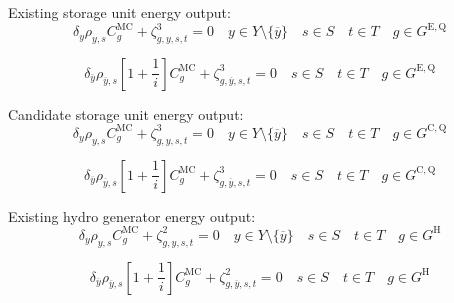 \documentclass{article}
\newcommand{\sGeneratorsHydro}{G^{\mathrm{H}}}
\newcommand{\sStorageExisting}{G^{\mathrm{E,Q}}}
\newcommand{\sStorageCandidate}{G^{\mathrm{C,Q}}}
\newcommand{\sYears}{Y}
\newcommand{\sScenarios}{S}
\newcommand{\sIntervals}{T}
\newcommand{\iGenerator}{g}
\newcommand{\iYear}{y}
\newcommand{\iYearTerminal}{\overline{\iYear}}
\newcommand{\iScenario}{s}
\newcommand{\iInterval}{t}
\newcommand{\cScenarioDuration}[1][\iYear,\iScenario]{\rho_{#1}}
\newcommand{\cMarginalCost}[1][\iGenerator,\iYear]{C^{\mathrm{MC}}_{#1}}
\newcommand{\cInterestRate}{i}
\newcommand{\cDiscountRate}[1][\iYear]{\delta_{#1}}
\newcommand{\dGeneratorEnergyOutput}[1][\iGenerator,\iYear,\iScenario,\iInterval]{\zeta_{#1}^{2}}
\newcommand{\dStorageEnergyOutput}[1][\iGenerator,\iYear,\iScenario,\iInterval]{\zeta_{#1}^{3}}
\begin{document}
Existing storage unit energy output:
\begin{equation}
\cDiscountRate\cScenarioDuration \cMarginalCost[\iGenerator] + \dStorageEnergyOutput = 0 \quad \iYear \in \sYears \setminus \{\iYearTerminal\} \quad \iScenario \in \sScenarios \quad \iInterval \in \sIntervals \quad  \iGenerator \in \sStorageExisting
\end{equation}

\begin{equation}
\cDiscountRate[\iYearTerminal] \cScenarioDuration[\iYearTerminal,\iScenario] \left[1 + \frac{1}{\cInterestRate}\right] \cMarginalCost[\iGenerator] + \dStorageEnergyOutput[\iGenerator,\iYearTerminal,\iScenario,\iInterval] = 0 \quad \iScenario \in \sScenarios \quad \iInterval \in \sIntervals \quad  \iGenerator \in \sStorageExisting
\end{equation}

Candidate storage unit energy output:
\begin{equation}
\cDiscountRate\cScenarioDuration \cMarginalCost[\iGenerator] + \dStorageEnergyOutput = 0 \quad \iYear \in \sYears \setminus \{\iYearTerminal\} \quad \iScenario \in \sScenarios \quad \iInterval \in \sIntervals \quad  \iGenerator \in \sStorageCandidate
\end{equation}

\begin{equation}
\cDiscountRate[\iYearTerminal] \cScenarioDuration[\iYearTerminal,\iScenario] \left[1 + \frac{1}{\cInterestRate}\right] \cMarginalCost[\iGenerator] + \dStorageEnergyOutput[\iGenerator, \iYearTerminal,\iScenario,\iInterval] = 0 \quad \iScenario \in \sScenarios \quad \iInterval \in \sIntervals \quad  \iGenerator \in \sStorageCandidate
\end{equation}

Existing hydro generator energy output:
\begin{equation}
\cDiscountRate\cScenarioDuration \cMarginalCost[\iGenerator] + \dGeneratorEnergyOutput = 0 \quad \iYear \in \sYears \setminus \{\iYearTerminal\} \quad \iScenario \in \sScenarios \quad \iInterval \in \sIntervals \quad \iGenerator \in \sGeneratorsHydro
\end{equation}

\begin{equation}
\cDiscountRate[\iYearTerminal] \cScenarioDuration[\iYearTerminal,\iScenario] \left[1 + \frac{1}{\cInterestRate}\right] \cMarginalCost[\iGenerator] + \dGeneratorEnergyOutput[\iGenerator,\iYearTerminal,\iScenario,\iInterval] = 0 \quad \iScenario \in \sScenarios \quad \iInterval \in \sIntervals \quad \iGenerator \in \sGeneratorsHydro
\end{equation}
\end{document}
